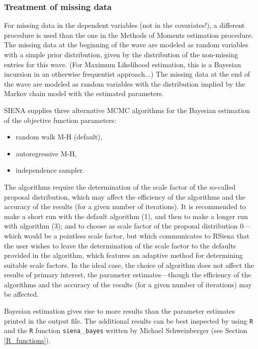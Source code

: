 \documentclass[a4paper,fleqn,11pt]{article}
\newcommand{\+}{\, + \,}
\newcommand{\RS}{{\sf \textsf{RSiena} }}
\newcommand{\SI}{{\sf SIENA }}
\begin{document}
\subsubsection{Treatment of missing data}

For missing data in the dependent variables (not in the covariates!),
a different procedure is used than the one in the Methods of Moments
estimation procedure.
The missing data at the beginning of the wave are modeled as random
variables with a simple prior distribution, given by the
distribution of the non-missing entries for this wave.
(For Maximum Likelihood estimation, this is a Bayesian incursion
in an otherwise frequentist approach...)
The missing data at the end of the wave are modeled
as random variables with the distribution implied
by the Markov chain model with the estimated parameters.


\iffalse
\SI supplies three alternative MCMC algorithms for the
Bayesian estimation of the objective function parameters:
\begin{itemize}
\item[(1)] random walk M-H (default),
\item[(2)] autoregressive M-H,
\item[(3)] independence sampler.
\end{itemize}
The algorithms require the determination of the scale factor of
the so-called proposal distribution, which may affect the efficiency
of the algorithms and the accuracy of the results (for a given number of iterations).
It is recommended to make a short run with the default algorithm (1),
and then to make a longer run with algorithm (3);
and to choose as scale factor of the proposal
distribution $0$---which would be a pointless scale factor,
but which communicates to \RS that the user wishes to
leave the determination of the scale factor to the defaults provided in the algorithm,
which features an adaptive method for determining suitable
scale factors.
In the ideal case, the choice of algorithm does not affect the
results of primary interest, the parameter estimates---though the
efficiency of the algorithms and the accuracy of the results (for a
given number of iterations) may be affected.

Bayesian estimation gives rise to more results than the parameter
estimates printed in the output file.
The additional results can be best inspected by using {\tt R} and the
{\tt R} function {\tt siena}\_{\tt bayes} written by Michael
Schweinberger (see Section \ref{R_functions}).
\end{document}
